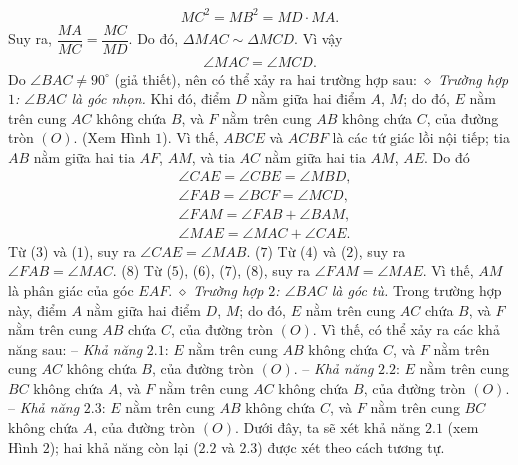 \begin{multicols}{2}
	\begin{align*}
		M{C^2} = M{B^2} = MD \cdot MA.
	\end{align*}
	Suy ra, $\dfrac{{MA}}{{MC}} = \dfrac{{MC}}{{MD}}$.  Do đó, $\Delta MAC \sim \Delta MCD$. Vì vậy
	\begin{align*}
		\angle MAC = \angle MCD. \tag{$2$}
	\end{align*}
	Do $\angle BAC \ne {90^{\circ}}$  (giả thiết), nên có thể xảy ra hai trường hợp sau:
	\vskip 0.05cm
	$\diamond$ \textit{Trường hợp $1$: $\angle BAC$ là góc nhọn.}
	\vskip 0.05cm
	Khi đó, điểm $D$ nằm giữa hai điểm $A$, $M$; do đó, $E$ nằm trên cung $AC$ không chứa $B$, và $F$ nằm trên cung $AB$ không chứa $C$, của đường tròn $(O)$. (Xem Hình $1$).
	\vskip 0.05cm
	Vì thế, $ABCE$ và $ACBF$ là các tứ giác lồi nội tiếp; tia $AB$ nằm giữa hai tia $AF$, $AM$, và tia $AC$ nằm giữa hai tia $AM$, $AE$. Do đó
	\begin{align*}
		&\angle CAE = \angle CBE = \angle MBD, \tag{$3$}\\
		&\angle FAB = \angle BCF = \angle MCD, \tag{$4$}\\
		&\angle FAM = \angle FAB + \angle BAM,\tag{$5$}\\
		&\angle MAE = \angle MAC + \angle CAE.\tag{$6$}
	\end{align*}
	Từ ($3$) và ($1$), suy ra $\angle CAE = \angle MAB.$  \hfill ($7$)
	\vskip 0.05cm
	Từ ($4$) và ($2$), suy ra $\angle FAB = \angle MAC.$ \hfill ($8$)
	\vskip 0.05cm
	Từ ($5$), ($6$), ($7$), ($8$), suy ra $\angle FAM = \angle MAE$.  Vì thế, $AM$ là phân giác của góc $EAF$.
	\vskip 0.05cm
	$\diamond$ \textit{Trường hợp $2$: $\angle BAC$  là góc tù.}
	\vskip 0.05cm
	Trong trường hợp này, điểm $A$ nằm giữa hai điểm $D$, $M$; do đó, $E$ nằm trên cung $AC$ chứa $B$, và $F$ nằm trên cung $AB$ chứa $C$, của đường tròn $(O)$.
	\vskip 0.05cm
	Vì thế, có thể xảy ra các khả năng sau:
	\vskip 0.05cm
	-- \textit{Khả năng} $2.1$: $E$ nằm trên cung $AB$ không chứa $C$, và $F$ nằm trên cung $AC$ không chứa $B$, của đường tròn $(O)$.
	\vskip 0.05cm
	-- \textit{Khả năng} $2.2$: $E$ nằm trên cung $BC$ không chứa $A$, và $F$ nằm trên cung $AC$ không chứa $B$, của đường tròn $(O)$.
	\vskip 0.05cm
	-- \textit{Khả năng} $2.3$: $E$ nằm trên cung $AB$ không chứa $C$, và $F$ nằm trên cung $BC$ không chứa $A$, của đường tròn $(O)$.
	\vskip 0.05cm
	Dưới đây, ta sẽ xét khả năng $2.1$ (xem Hình $2$); hai khả năng còn lại ($2.2$ và $2.3$) được xét theo cách tương tự.
	\begin{figure}[H]
		\vspace*{-5pt}

\end{figure}
\end{multicols}
